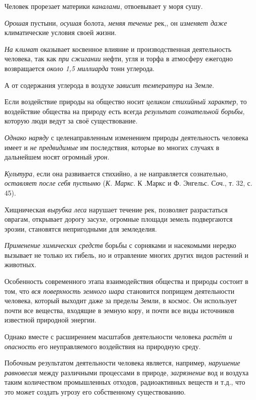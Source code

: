 \documentclass[a4paper,14pt,russian]{extreport}
\begin{document}
Человек прорезает материки \emph{каналами}, отвоевывает у моря сушу.

\emph{Орошая} пустыни, \emph{осушая} болота, \emph{меняя течение} рек,, он \emph{изменяет даже} климатические условия своей жизни.

\emph{На климат} оказывает косвенное влияние и производственная деятельность человека, так как \emph{при сжигании} нефти, угля и торфа в атмосферу ежегодно возвращается \emph{около 1,5 миллиарда} тонн углерода.

А от содержания углерода в воздухе \emph{зависит температура} на Земле.

Если воздействие природы на общество носит \emph{целиком стихийный характер}, то воздействие общества на природу есть всегда \emph{результат сознательной борьбы}, которую люди ведут за своё существование.

\emph{Однако наряду} с целенаправленным изменением природы деятельность человека имеет и \emph{не предвидимые} им последствия, которые во многих случаях в дальнейшем носят огромный \emph{урон}.

\emph{Культура}, если она развивается стихийно, а не направляется сознательно, \emph{оставляет после себя пустыню} (\emph{К. Маркс}. К .Маркс и Ф. Энгельс. Соч., т. 32, с. 45).

Хищническая \emph{вырубка леса} нарушает течение рек, позволяет разрастаться оврагам, открывает дорогу засухе, огромные площади земель подвергаются эрозии, становятся непригодными для земледелия.

\emph{Применение химических средств} борьбы с сорняками и насекомыми нередко вызывает не только их гибель, но и отравление многих других видов растений и животных.

Особенность современного этапа взаимодействия общества и природы состоит в том, что \emph{вся поверхность земного шара} становится поприщем деятельности человека, который выходит даже за пределы Земли, в космос. Он использует почти все вещества, входящие в земную кору, и почти все виды источников известной природной энергии.

Однако вместе с расширением масштабов деятельности человека \emph{растёт и опасность} его неуправляемого воздействия на природную среду.

Побочным результатом деятельности человека является, например, \emph{нарушение равновесия} между различными процессами в природе, \emph{загрязнение} вод и воздуха таким количеством промышленных отходов, радиоактивных веществ и т.д., что это может создать угрозу его собственному существованию.
\end{document}

